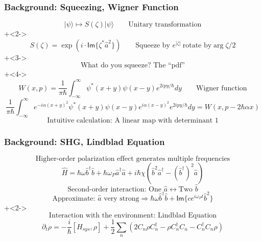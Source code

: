 \documentclass{beamer}
\newcommand*\ket[1]{|{#1}\rangle}
\begin{document}
\begin{frame}[c]
\frametitle{Background: Squeezing, Wigner Function}
  \[\ket{\psi}\mapsto S(\zeta)\ket{\psi}\qquad
    \text{Unitary transformation}
  \]
  \onslide+<2->
  \[S(\zeta)=\exp(i\cdot\mathsf{Im}\{\zeta^{*} \hat{a}^{2}\})\qquad
    \text{Squeeze by }e^{|\zeta|}\:\text{rotate by}\arg{\zeta}/2
  \]
  \onslide+<3->
  \[
    \text{What do you squeeze? The ``pdf''}
  \]
  \onslide+<4->
  \[
    W(x,p)=\frac{1}{\pi\hbar}\int_{-\infty}^{\infty}\psi^{*}(x+y)\psi(x-y)e^{2ipy/\hbar}dy\qquad
    \text{Wigner function}
  \]
  \[
    \frac{1}{\pi\hbar}\int_{-\infty}^{\infty}e^{-i\alpha(x+y)^{2}}\psi^{*}(x+y)\psi(x-y)e^{i\alpha(x-y)^{2}}e^{2ipy/\hbar}dy=W(x,p-2\hbar\alpha x)
  \]
  \[
    \text{Intuitive calculation: A linear map with determinant 1}
  \]
\end{frame}

\begin{frame}[c]
\frametitle{Background: SHG, Lindblad Equation}
  \[
    \text{Higher-order polarization effect generates multiple frequencies}
  \]
  \[
    \hat{H}=\hbar\omega \hat{b}^{\dag}\hat{b}+\hbar\omega_{P}\hat{a}^{\dag}\hat{a}+i\hbar\chi(\hat{b}^{2}\hat{a}^{\dag}-(\hat{b}^{\dag})^{2}\hat{a})
  \]
  \[
    \text{Second-order interaction: One }\hat{a}\leftrightarrow\text{Two }\hat{b}
  \]
  \[
    \text{Approximate: }\hat{a}\text{ very strong}\Rightarrow\hbar\omega \hat{b}^{\dag}\hat{b}+\mathsf{Im}\{ce^{i\omega_{P}t}\hat{b}^{2}\}
  \]
  \onslide+<2->
  \[
    \text{Interaction with the environment: Lindblad Equation}
  \]
  \[
    \partial_{t}\rho=-\frac{i}{\hbar}[H_{sys},\rho]+\frac{1}{2}\sum_{n}(2C_{n}\rho C_{n}^{\dag}-\rho C_{n}^{\dag}C_{n}-C_{n}^{\dag} C_{n}\rho)
  \]
\end{frame}
\end{document}
